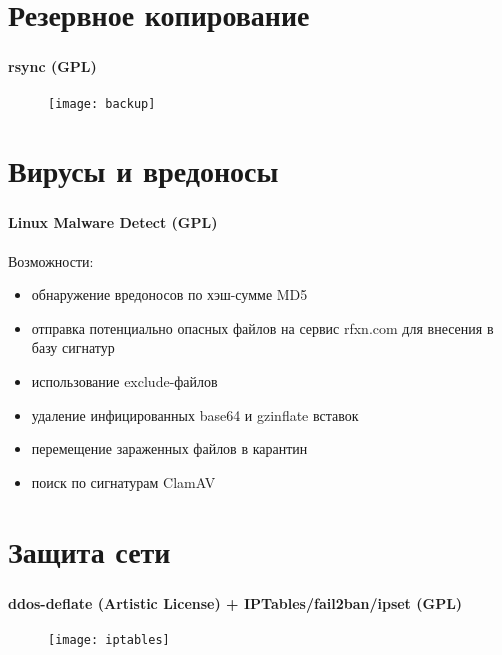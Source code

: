 
\section{Резервное копирование}

\begin{frame}
\frametitle{\insertsection}
\framesubtitle{rsync (GPL)}
\begin{figure}[h]
	\begin{center}
		\texttt{[image: backup]}
	\end{center}
\end{figure}
\end{frame}


\section{Вирусы и вредоносы}

\begin{frame}
\frametitle{\insertsection}
\framesubtitle{Linux Malware Detect (GPL)}
Возможности:
\begin{itemize}
	\item обнаружение вредоносов по хэш-сумме MD5
	\item отправка потенциально опасных файлов на сервис rfxn.com для внесения в базу сигнатур
	\item использование exclude-файлов
	\item удаление инфицированных base64 и gzinflate вставок
	\item перемещение зараженных файлов в карантин
	\item поиск по сигнатурам ClamAV
\end{itemize}
\end{frame}


\section{Защита сети}

\begin{frame}
\frametitle{\insertsection}
\framesubtitle{ddos-deflate (Artistic License) + IPTables/fail2ban/ipset (GPL)}
\begin{figure}[h]
	\begin{center}
		\texttt{[image: iptables]}
	\end{center}
\end{figure}
\end{frame}

